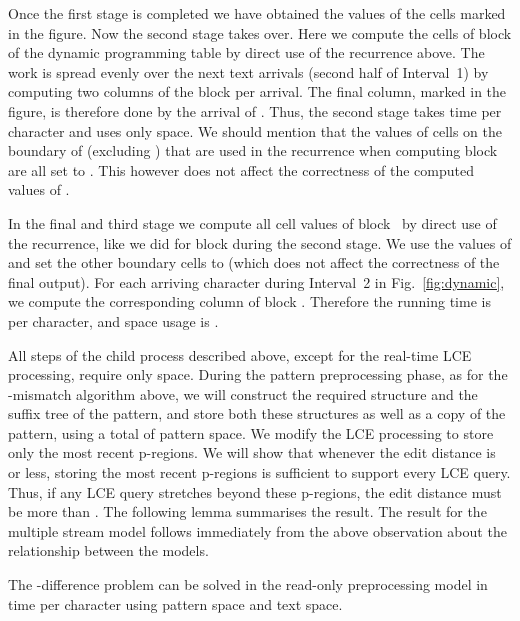 \documentclass[envcountsame]{llncs}
\newcommand{\pregions}{\mbox{p-regions}\xspace}
\begin{document}
Once the first stage is completed we have obtained the values of the cells marked  in the figure. Now the second stage takes over. Here we compute the cells of block  of the dynamic programming table by direct use of the recurrence above. The work is spread evenly over the next  text arrivals (second half of Interval~1) by computing two columns of the block  per arrival. The final column, marked  in the figure, is therefore done by the arrival of . Thus, the second stage takes  time per character and uses only  space. We should mention that the values of cells on the boundary of  (excluding ) that are used in the recurrence when computing block  are all set to . This however does not affect the correctness of the computed values of .

In the final and third stage we compute all cell values of block~ by direct use of the recurrence, like we did for block  during the second stage. We use the values of  and set the other boundary cells to  (which does not affect the correctness of the final output). For each arriving character during Interval~2 in Fig.~\ref{fig:dynamic}, we compute the corresponding column of  block . Therefore the running time is  per character, and space usage is .

All steps of the child process described above, except for the real-time LCE processing, require only  space. During the pattern preprocessing phase, as for the -mismatch algorithm above, we will construct the required  structure and the suffix tree of the pattern, and store both these structures as well as a copy of the pattern, using a total of  pattern space.
We modify the LCE processing to store only the most recent  \pregions.
We will show that whenever the edit distance is  or less, storing the  most recent \pregions is sufficient to support every LCE query. Thus, if any LCE query stretches beyond these \pregions, the edit distance must be more than . The following lemma summarises the result. The result for the multiple stream model follows immediately from the above observation about the relationship between the models.



\begin{lemma}
    \label{lem:k-diff}
    The -difference problem can be solved in the read-only
    preprocessing model in   time per character using  pattern space and  text space.
\end{lemma}
\end{document}
